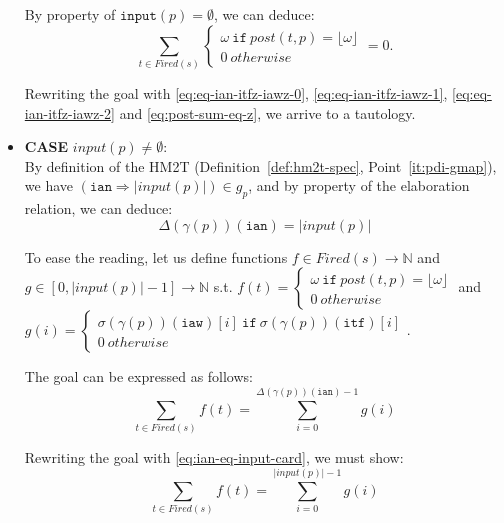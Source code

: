 \begin{pf}
\begin{itemize}
    By property of $\mathtt{input}(p)=\emptyset$, we can deduce:
    \begin{equation}
      \sum\limits_{t\in{}Fired(s)}
      \begin{cases}
        \omega~\mathtt{if}~post(t,p)=\lfloor\omega\rfloor \\
        0~otherwise
      \end{cases}=0.
      \label{eq:post-sum-eq-z}    
    \end{equation}

    \noindent{}Rewriting the goal with \eqref{eq:eq-ian-itfz-iawz-0},
    \eqref{eq:eq-ian-itfz-iawz-1}, \eqref{eq:eq-ian-itfz-iawz-2} and
    \eqref{eq:post-sum-eq-z}, we arrive to a tautology.\\
    
  \item \textbf{CASE} $input(p)\neq\emptyset$:\\

    By definition of the HM2T (Definition~\ref{def:hm2t-spec},
    Point~\ref{it:pdi-gmap}), we have
    $(\mathtt{ian}\Rightarrow{}\vert{}input(p)\vert)\in{}g_p$, and by
    property of the elaboration relation, we can deduce:
    \begin{equation}
      \Delta(\gamma(p))(\texttt{ian})=\vert{}input(p)\vert\label{eq:ian-eq-input-card}
    \end{equation}

    To ease the reading, let us define functions
    $f\in{}Fired(s)\rightarrow\mathbb{N}$ and
    $g\in[0,\vert{}input(p)\vert-1]\rightarrow\mathbb{N}$ s.t. $f(t)=
    \begin{cases}
      \omega~\mathtt{if}~post(t,p)=\lfloor\omega\rfloor \\
      0~otherwise
    \end{cases}$
    and $g(i)=
    \begin{cases}
      \sigma(\gamma(p))(\texttt{iaw})[i]~\mathtt{if}~\sigma(\gamma(p))(\texttt{itf})[i]\\
      0~otherwise 
    \end{cases}$.

    \noindent{}The goal can be expressed as follows:
    \begin{equation*}
      \boxed{\sum\limits_{t\in{}Fired(s)}f(t)=\sum\limits_{i=0}^{\Delta(\gamma(p))(\texttt{ian})-1}g(i)}
    \end{equation*}
    
    \noindent{}Rewriting the goal with \eqref{eq:ian-eq-input-card}, we must show:
    \begin{equation*}
      \boxed{\sum\limits_{t\in{}Fired(s)}f(t)=\sum\limits_{i=0}^{\vert{}input(p)\vert-1}g(i)}
    \end{equation*}


\end{itemize}
\end{pf}
